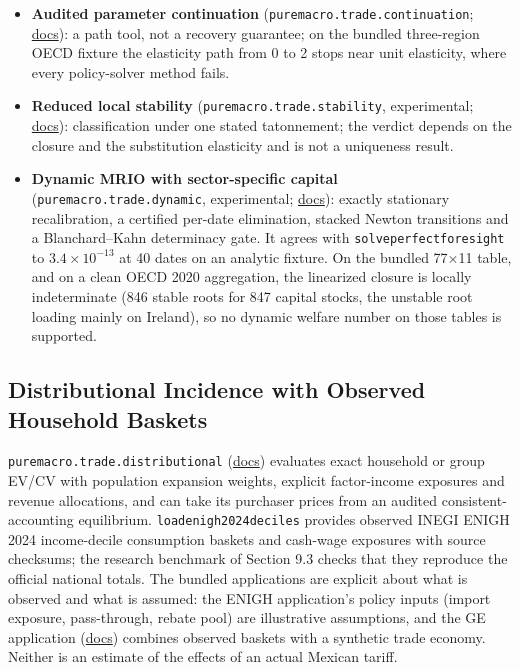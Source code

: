 \documentclass[11pt,letterpaper]{article}
\renewcommand{\_}{\pmunderscore\allowbreak}
\begin{document}
\begin{itemize}
\item
  \textbf{Audited parameter continuation} (\texttt{puremacro.trade.continuation}; \href{https://github.com/jalonso1979/puremacro/blob/v4.6.0/docs/trade_continuation.md}{docs}): a path tool, not a recovery guarantee; on the bundled three-region OECD fixture the elasticity path from 0 to 2 stops near unit elasticity, where every policy-solver method fails.
\item
  \textbf{Reduced local stability} (\texttt{puremacro.trade.stability}, experimental; \href{https://github.com/jalonso1979/puremacro/blob/v4.6.0/docs/trade_stability.md}{docs}): classification under one stated tatonnement; the verdict depends on the closure and the substitution elasticity and is not a uniqueness result.
\item
  \textbf{Dynamic MRIO with sector-specific capital} (\texttt{puremacro.trade.dynamic}, experimental; \href{https://github.com/jalonso1979/puremacro/blob/v4.6.0/docs/trade_dynamic.md}{docs}): exactly stationary recalibration, a certified per-date elimination, stacked Newton transitions and a Blanchard--Kahn determinacy gate. It agrees with \texttt{solve\_perfect\_foresight} to \(3.4\times10^{-13}\) at 40 dates on an analytic fixture. On the bundled 77×11 table, and on a clean OECD 2020 aggregation, the linearized closure is locally indeterminate (846 stable roots for 847 capital stocks, the unstable root loading mainly on Ireland), so no dynamic welfare number on those tables is supported.
\end{itemize}

\subsection{Distributional Incidence with Observed Household Baskets}\label{distributional-incidence-with-observed-household-baskets}

\texttt{puremacro.trade.distributional} (\href{https://github.com/jalonso1979/puremacro/blob/v4.6.0/docs/trade_distributional.md}{docs}) evaluates exact household or group EV/CV with population expansion weights, explicit factor-income exposures and revenue allocations, and can take its purchaser prices from an audited consistent-accounting equilibrium. \texttt{load\_enigh2024\_deciles} provides observed INEGI ENIGH 2024 income-decile consumption baskets and cash-wage exposures with source checksums; the research benchmark of Section 9.3 checks that they reproduce the official national totals. The bundled applications are explicit about what is observed and what is assumed: the ENIGH application's policy inputs (import exposure, pass-through, rebate pool) are illustrative assumptions, and the GE application (\href{https://github.com/jalonso1979/puremacro/blob/v4.6.0/docs/distributional_trade_ge.md}{docs}) combines observed baskets with a synthetic trade economy. Neither is an estimate of the effects of an actual Mexican tariff.
\end{document}
